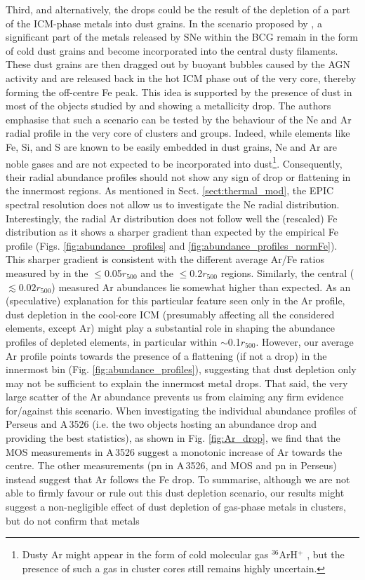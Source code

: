 \documentclass{aa}
\begin{document}
Third, and alternatively, the drops could be the result of the depletion of a part of the ICM-phase metals into dust grains. In the scenario proposed by \citet{2013MNRAS.433.3290P,2015MNRAS.447..417P}, a significant part of the metals released by SNe within the BCG remain in the form of cold dust grains \citep{2011ApJ...738L..24V} and become incorporated into the central dusty filaments. These dust grains are then dragged out by buoyant bubbles caused by the AGN activity and are released back in the hot ICM phase out of the very core, thereby forming the off-centre Fe peak. This idea is supported by the presence of dust in most of the objects studied by \citet{2015MNRAS.447..417P} and showing a metallicity drop. The authors emphasise that such a scenario can be tested by the behaviour of the Ne and Ar radial profile in the very core of clusters and groups. Indeed, while elements like Fe, Si, and S are known to be easily embedded in dust grains, Ne and Ar are noble gases and are not expected to be incorporated into dust\footnote{Dusty Ar might appear in the form of cold molecular gas $^{36}$ArH$^+$ \citep{2013Sci...342.1343B}, but the presence of such a gas in cluster cores still remains highly uncertain.}. Consequently, their radial abundance profiles should not show any sign of drop or flattening in the innermost regions. As mentioned in Sect. \ref{sect:thermal_mod}, the EPIC spectral resolution does not allow us to investigate the Ne radial distribution. Interestingly, the radial Ar distribution does not follow well the (rescaled) Fe distribution as it shows a sharper gradient than expected by the empirical Fe profile (Figs. \ref{fig:abundance_profiles} and \ref{fig:abundance_profiles_normFe}). This sharper gradient is consistent with the different average Ar/Fe ratios measured by \citet{2016A&A...595A.126M} in the $\le$0.05$r_{500}$ and the $\le$0.2$r_{500}$ regions. Similarly, the central ($\lesssim 0.02 r_{500}$) measured Ar abundances lie somewhat higher than expected. As an (speculative) explanation for this particular feature seen only in the Ar profile, dust depletion in the cool-core ICM (presumably affecting all the considered elements, except Ar) might play a substantial role in shaping the abundance profiles of depleted elements, in particular within $\sim$0.1$r_{500}$. However, our average Ar profile points towards the presence of a flattening (if not a drop) in the innermost bin (Fig. \ref{fig:abundance_profiles}), suggesting that dust depletion only may not be sufficient to explain the innermost metal drops. That said, the very large scatter of the Ar abundance prevents us from claiming any firm evidence for/against this scenario. When investigating the individual abundance profiles of Perseus and A\,3526 (i.e. the two objects hosting an abundance drop and providing the best statistics), as shown in Fig. \ref{fig:Ar_drop}, we find that the MOS measurements in A\,3526 suggest a monotonic increase of Ar towards the centre. The other measurements (pn in A\,3526, and MOS and pn in Perseus) instead suggest that Ar follows the Fe drop. To summarise, although we are not able to firmly favour or rule out this dust depletion scenario, our results might suggest a non-negligible effect of dust depletion of gas-phase metals in clusters, but do not confirm that metals 
\end{document}
